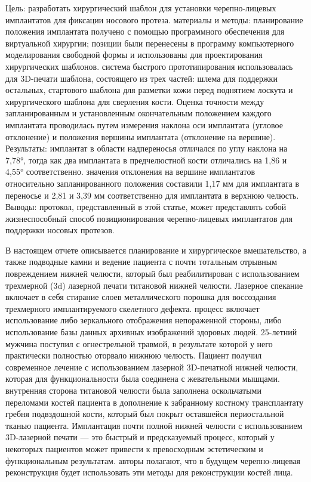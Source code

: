 Цель: разработать хирургический шаблон для установки черепно-лицевых имплантатов
для фиксации носового протеза. материалы и методы: планирование положения
имплантата получено с помощью программного обеспечения для виртуальной хирургии;
позиции были перенесены в программу компьютерного моделирования свободной формы
и использованы для проектирования хирургических шаблонов. система быстрого
прототипирования использовалась для 3D-печати шаблона, состоящего из трех
частей: шлема для поддержки остальных, стартового шаблона для разметки кожи
перед поднятием лоскута и хирургического шаблона для сверления кости. Оценка
точности между запланированным и установленным окончательным положением каждого
имплантата проводилась путем измерения наклона оси имплантата (угловое
отклонение) и положения вершины имплантата (отклонение на вершине). Результаты:
имплантат в области надпереносья отличался по углу наклона на 7,78°, тогда как
два имплантата в предчелюстной кости отличались на 1,86 и 4,55° соответственно.
значения отклонения на вершине имплантатов относительно запланированного
положения составили 1,17 мм для имплантата в переносье и 2,81 и 3,39 мм
соответственно для имплантата в верхнюю челюсть. Выводы: протокол,
представленный в этой статье, может представлять собой жизнеспособный способ
позиционирования черепно-лицевых имплантатов для поддержки носовых
протезов.\cite{21198902}

В настоящем отчете описывается планирование и хирургическое вмешательство, а
также подводные камни и ведение пациента с почти тотальным отрывным повреждением
нижней челюсти, который был реабилитирован с использованием трехмерной (3d)
лазерной печати титановой нижней челюсти. Лазерное спекание включает в себя
стирание слоев металлического порошка для воссоздания трехмерного
имплантируемого скелетного дефекта. процесс включает использование либо
зеркального отображения непораженной стороны, либо использование базы данных
архивных изображений здоровых людей. 25-летний мужчина поступил с огнестрельной
травмой, в результате которой у него практически полностью оторвало нижнюю
челюсть. Пациент получил современное лечение с использованием лазерной
3D-печатной нижней челюсти, которая для функциональности была соединена с
жевательными мышцами. внутренняя сторона титановой челюсти была заполнена
оскольчатыми переломами костей пациента в дополнение к забранному костному
трансплантату гребня подвздошной кости, который был покрыт оставшейся
периостальной тканью пациента. Имплантация почти полной нижней челюсти с
использованием 3D-лазерной печати — это быстрый и предсказуемый процесс, который
у некоторых пациентов может привести к превосходным эстетическим и
функциональным результатам. авторы полагают, что в будущем черепно-лицевая
реконструкция будет использовать эти методы для реконструкции костей
лица.\cite{28005765}
